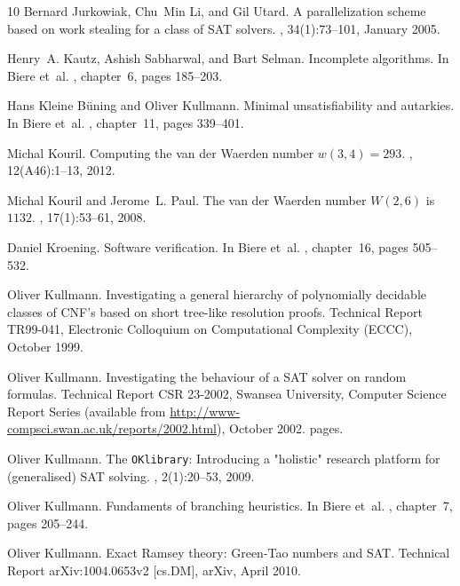 \documentclass[final,3p,times]{elsarticle}
\theoremstyle{definition}
\newcommand{\OKlibrary}{\texttt{OKlibrary}}
\begin{document}
\begin{thebibliography}{10}
Bernard Jurkowiak, Chu~Min Li, and Gil Utard.
\newblock A parallelization scheme based on work stealing for a class of {SAT}
  solvers.
, 34(1):73--101, January 2005.

Henry~A. Kautz, Ashish Sabharwal, and Bart Selman.
\newblock Incomplete algorithms.
\newblock In Biere et~al. \cite{2008HandbuchSAT}, chapter~6, pages 185--203.

Hans {Kleine B{\"{u}}ning} and Oliver Kullmann.
\newblock Minimal unsatisfiability and autarkies.
\newblock In Biere et~al. \cite{2008HandbuchSAT}, chapter~11, pages 339--401.

Michal Kouril.
\newblock Computing the van der {W}aerden number $w(3,4) = 293$.
,
  12(A46):1--13, 2012.

Michal Kouril and Jerome~L. Paul.
\newblock The van der {W}aerden number ${W}(2,6)$ is $1132$.
, 17(1):53--61, 2008.

Daniel Kroening.
\newblock Software verification.
\newblock In Biere et~al. \cite{2008HandbuchSAT}, chapter~16, pages 505--532.

Oliver Kullmann.
\newblock Investigating a general hierarchy of polynomially decidable classes
  of {CNF}'s based on short tree-like resolution proofs.
\newblock Technical Report TR99-041, Electronic Colloquium on Computational
  Complexity (ECCC), October 1999.

Oliver Kullmann.
\newblock Investigating the behaviour of a {SAT} solver on random formulas.
\newblock Technical Report CSR 23-2002, Swansea University, Computer Science
  Report Series (available from
  \url{http://www-compsci.swan.ac.uk/reports/2002.html}), October 2002.
 pages.

Oliver Kullmann.
\newblock The {\OKlibrary}: Introducing a "holistic" research platform for
  (generalised) {SAT} solving.
, 2(1):20--53, 2009.

Oliver Kullmann.
\newblock Fundaments of branching heuristics.
\newblock In Biere et~al. \cite{2008HandbuchSAT}, chapter~7, pages 205--244.

Oliver Kullmann.
\newblock Exact {R}amsey theory: {G}reen-{T}ao numbers and {SAT}.
\newblock Technical Report arXiv:1004.0653v2 [cs.DM], arXiv, April 2010.


\end{thebibliography}
\end{document}
